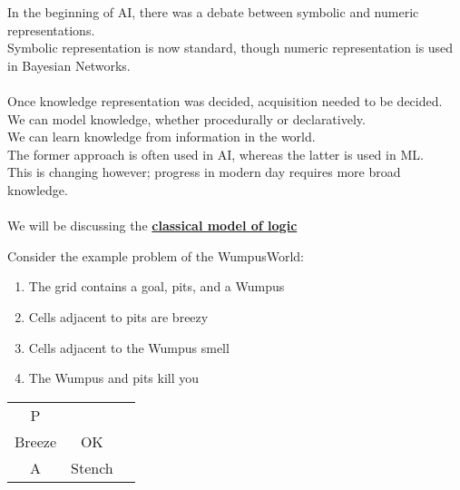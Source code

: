 \documentclass[../../lecture_notes.tex]{subfiles}
\begin{document}
\noindent In the beginning of AI, there was a debate between symbolic and numeric representations.\\
Symbolic representation is now standard, though numeric representation is used in Bayesian Networks.\\
\\
Once knowledge representation was decided, acquisition needed to be decided.\\
	\indent We can model knowledge, whether procedurally or declaratively.\\
	\indent We can learn knowledge from information in the world.\\
The former approach is often used in AI, whereas the latter is used in ML.\\
This is changing however; progress in modern day requires more broad knowledge.\\
\\
We will be discussing the \textbf{\underline{classical model of logic}}

\begin{center}  \end{center}

\begin{center} \begin{minipage}{0.5\textwidth}
\noindent Consider the example problem of the WumpusWorld:
\begin{enumerate} [itemsep=0mm]
	\item The grid contains a goal, pits, and a Wumpus
	\item Cells adjacent to pits are breezy
	\item Cells adjacent to the Wumpus smell
	\item The Wumpus and pits kill you
\end{enumerate} \end{minipage}%
\begin{minipage}{0.5\textwidth}
\begin{tabular}{ | c | c | c | }
	\hline
	 \text{      } & \text{      } & \text{      }  \\
	\hline
	P & & \\
	\hline
	Breeze & OK & \\
	\hline
	A & Stench & \text{  W  }\\
	\hline
\end{tabular} \end{minipage} \end{center}
\end{document}
